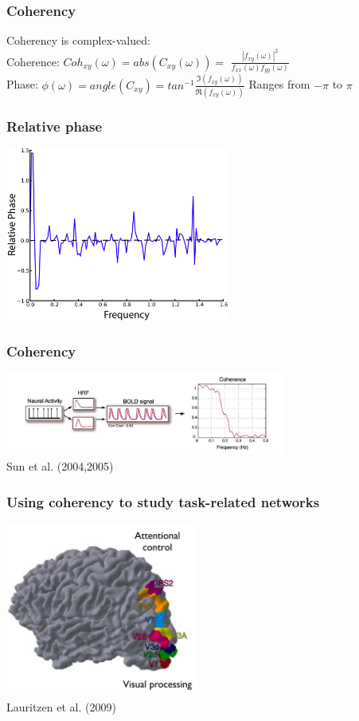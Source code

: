 \documentclass{beamer}
\begin{document}
\begin{frame}
\frametitle{Coherency}
Coherency is complex-valued:
\\
\vfill
Coherence: $Coh_{xy} (\omega) = abs(C_{xy}(\omega)) = $
$\frac{|f_{xy}(\omega)|^2}{f_{xx}(\omega)f_{yy}(\omega)}$
\\
\pause
\vfill
Phase: $\phi(\omega)= angle(C_{xy}) =
tan^{-1}\frac{\Im(f_{xy}(\omega))}{\Re(f_{xy}(\omega))}$
\vfill
\pause
Ranges from $-\pi$ to $\pi$
\end{frame}


\begin{frame}
\frametitle{Relative phase}
\includegraphics[height=5.7cm]{figures/outa_phase_tseries_ph}
\end{frame}

\begin{frame}
\frametitle{Coherency}
\includegraphics[height=2.7cm]{figures/tseries_w_hemo_w_coh}
\\
\hfill
Sun et al. (2004,2005)
\end{frame}

\begin{frame}
\frametitle{Using coherency to study task-related networks}
\includegraphics[height=5.7cm]{figures/lauritzen1}
\\
\hfill 
Lauritzen et al. (2009)
\end{frame}
\end{document}
